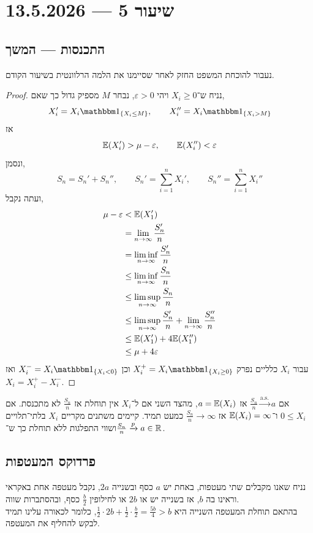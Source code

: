 \section{שיעור 5 --- 13.5.2026}
\subsection{התכנסות --- המשך}
נעבור להוכחת המשפט החזק לאחר שסיימנו את הלמה הרלוונטית בשיעור הקודם.
\begin{proof}
	נניח ש־$X_i \ge 0$ ויהי $\varepsilon > 0$, נבחר $M$ מספיק גדול כך שאם,
	\[
		X_i' = X_i \indicator_{\{ X_i \le M \}},
		\qquad
		X_i'' = X_i \indicator_{\{ X_i > M \}}
	\]
	אז 
	\[
		\mathbb{E}(X_i') > \mu - \varepsilon,
		\qquad
		\mathbb{E}(X_i'') < \varepsilon
	\]
	ונסמן,
	\[
		S_n = S_n' + S_n'',
		\qquad
		S_n' = \sum_{i = 1}^n X_i',
		\qquad
		S_n'' = \sum_{i = 1}^n X_i''
	\]
	ועתה נקבל,
	\begin{align*}
		\mu - \varepsilon
		& < \mathbb{E}(X_1') \\
		& = \lim_{n \to \infty} \frac{S_n'}{n} \\
		& = \liminf_{n \to \infty} \frac{S_n'}{n} \\
		& \le \liminf_{n \to \infty} \frac{S_n}{n} \\
		& \le \limsup_{n \to \infty} \frac{S_n}{n} \\
		& \le \limsup_{n \to \infty} \frac{S_n'}{n} + \lim_{n \to \infty} \frac{S_n''}{n} \\
		& \le \mathbb{E}(X_1') + 4 \mathbb{E}(X_1'') \\
		& \le \mu + 4 \varepsilon
	\end{align*}
	עבור $X_i$ כלליים נפרק $X_i^+ = X_i \indicator_{\{X_i \ge 0\}}$ וכן $X_i^- = X_i \indicator_{\{ X_i < 0 \}}$ ואז $X_i = X_i^+ - X_i^-$.
\end{proof}
אם $\frac{S_n}{n} \xrightarrow{\text{a.s.}} a$ אז $a = \mathbb{E}(X_i)$,
מהצד השני אם ל־$X_i$ אין תוחלת אז $\frac{S_n}{n}$ לא מתכנסת.
אם $0 \le X_i$ ו־$\mathbb{E}(X_i) = \infty$ אז $\frac{S_n}{n} \to \infty$ כמעט תמיד.
קיימים משתנים מקריים $X_i$ בלתי־תלויים ושווי התפלגות ללא תוחלת כך ש־$\frac{S_n}{n} \xrightarrow{p} a \in \mathbb{R}$.

\subsection{פרדוקס המעטפות}
נניח שאנו מקבלים שתי מעטפות, באחת יש $a$ כסף ובשנייה $2a$,
נקבל מעטפה אחת באקראי וראינו בה $b$, אז בשנייה יש או $2b$ או לחילופין $\frac{b}{2}$ כסף, ובהסתברות שווה. \\
בהתאם תוחלת המעטפה השנייה היא $\frac{1}{2} \cdot 2b + \frac{1}{2} \cdot \frac{b}{2} = \frac{5b}{4} > b$, כלומר לכאורה עלינו תמיד לבקש להחליף את המעטפה.

